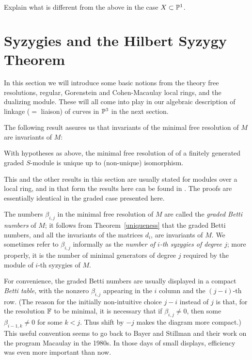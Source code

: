 \begin{exercise}
 Explain what is different from the above in the case $X\subset {\mathbb P}^{1}$.
\end{exercise}




\section{Syzygies and the Hilbert Syzygy Theorem} 
 
 In this  section we will introduce some basic notions from the theory free resolutions, regular, Gorenstein and Cohen-Macaulay local rings, and the dualizing module. These will all come into play in our algebraic description of linkage ($=$ liaison) of curves in ${\mathbb P}^{3}$ in the next section.

The following result assures us that invariants of the minimal free resolution of $M$ are invariants of $M$:

\begin{theorem}[Uniqueness]\cite[Theorem ***]{E}\label{uniqueness} With hypotheses as above, the minimal free resolution of of a finitely generated graded $S$-module is unique up to (non-unique) isomorphism.
\end{theorem}

This and the other results in this section are usually stated for
modules over a local ring, and in that form the results here can be found in \cite[Ch ?]{E}. The proofs are essentially identical in the graded case presented here.

The numbers $\beta_{i,j}$ in  the minimal free resolution of $M$ are called the \emph{graded Betti numbers} of $M$; it follows from Theorem~\ref{uniqueness} that the graded Betti numbers, and all the invariants of the matrices $d_{i}$, are invariants of $M$. 
We sometimes refer to $\beta_{i,j}$ informally as the \emph{number of $i$-th syzygies of degree $j$}; more properly, it is the number of minimal generators of degree $j$ required by the module of $i$-th syzygies of $M$.

For convenience, the graded Betti numbers are usually displayed in a compact \emph{Betti table}, with the nonzero $\beta_{i,j}$ appearing in the $i$ column and the $(j-i)$-th row. (The reason for the initially non-intuitive choice $j-i$ instead of $j$ is that, for the resolution ${\mathbb F}$ to be minimal, it is necessary that if $\beta_{i,j}\neq 0$, then some $\beta_{i-1,k}\neq 0$ for some $k<j$. Thus shift by $-j$ makes the diagram more compact.) This useful convention seems to go back to Bayer and Stillman and their work on the program Macaulay in the 1980s. In those days of small displays, efficiency was even more important than now.

